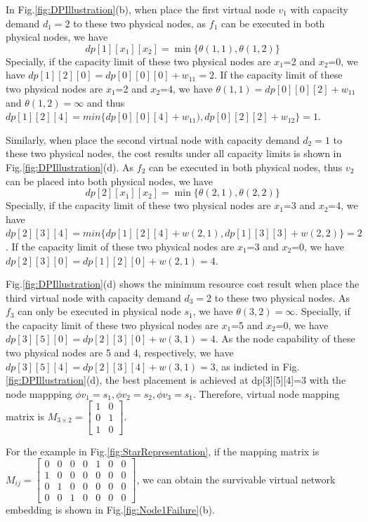 In Fig.\ref{fig:DPIllustration}(b), when place the first virtual node $v_1$ with capacity demand $d_1=2$ to these two physical nodes, as $f_1$ can be executed in both physical nodes,  we have
\begin{equation}
dp[1][{x_1}][{x_2}] = \min \{\theta (1,1),\theta (1,2)\}
\end{equation}
Specially, if the capacity limit of these two physical nodes are $x_1$=2 and $x_2$=0, we have $dp[1][2][0]= dp[0][0][0]+w_{11}=2$. If the capacity limit of these two physical nodes are $x_1$=2 and $x_2$=4, we have $\theta (1,1)=dp[0][0][2]+w_{11}$ and $\theta (1,2)=\infty$ and thus $dp[1][2][4]=min\{ dp[0][0][4]+w_{11}), dp[0][2][2]+w_{12} \}=1$.

Similarly, when place the second virtual node with capacity demand $d_2=1$ to these two physical nodes, the cost results under all capacity limits is shown in Fig.\ref{fig:DPIllustration}(d). As $f_2$ can be executed in both physical nodes, thus $v_2$ can be placed into both physical nodes, we have
\begin{equation}
dp[2][{x_1}][{x_2}] = \min \{\theta (2,1),\theta (2,2)\}
\end{equation}
Specially, if the capacity limit of these two physical nodes are $x_1$=3 and $x_2$=4, we have $dp[2][3][4]=min\{dp[1][2][4]+w(2,1), dp[1][3][3]+w(2,2)\}=2$. If the capacity limit of these two physical nodes are $x_1$=3 and $x_2$=0, we have $dp[2][3][0]=dp[1][2][0]+w(2,1)=4$.

Fig.\ref{fig:DPIllustration}(d) shows the minimum resource cost result  when  place the third virtual node with capacity demand $d_3=2$ to these two physical nodes. As $f_3$ can only be executed in physical node $s_1$, we have $\theta (3,2)=\infty$. Specially, if the capacity limit of these two physical nodes are $x_1$=5 and $x_2$=0, we have $dp[3][5][0]=dp[2][3][0]+w(3,1)=4$. As the node capability of these two physical nodes are 5 and 4, respectively, we have $dp[3][5][4]=dp[2][3][4]+w(3,1)=3$, as indicted in Fig.\ref{fig:DPIllustration}(d), the best placement is achieved at dp[3][5][4]=3 with the node mappping $\phi{v_1}= s_1, \phi{v_2}=s_2, \phi{v_3}=s_1$. Therefore, virtual node mapping matrix is
$M_{3 \times 2}=\left[ {\begin{array}{*{20}{c}}
1&0\\
0&1\\
1&0
\end{array}} \right]$.

For the example in Fig.\ref{fig:StarRepresentation}, if the mapping matrix is $M_{ij}=\left[ {\begin{array}{*{20}{c}}
0&0&0&0&1&0&0\\
1&0&0&0&0&0&0\\
0&1&0&0&0&0&0\\
0&0&1&0&0&0&0
\end{array}} \right]$, we can obtain the survivable virtual network embedding is shown in Fig.\ref{fig:Node1Failure}(b).


